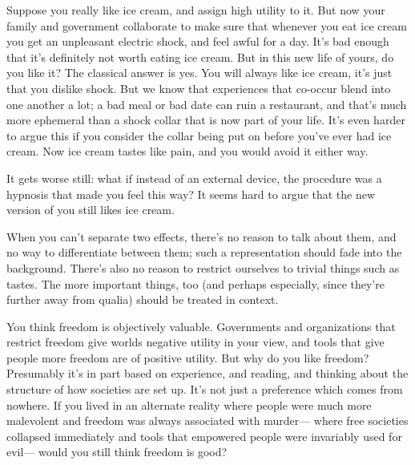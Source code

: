 \documentclass{article}
\begin{document}
	\begin{example}
		Suppose you really like ice cream, and assign high utility to it. But now your family and government collaborate to make sure that whenever you eat ice cream you get an unpleasant electric shock, and feel awful for a day. It's bad enough that it's definitely not worth eating ice cream. But in this new life of yours, do you like it? The classical answer is yes. You will always like ice cream, it's just that you dislike shock. But we know that experiences that co-occur blend into one another a lot; a bad meal or bad date can ruin a restaurant, and that's much more ephemeral than a shock collar that is now part of your life. It's even harder to argue this if you consider the collar being put on before you've ever had ice cream. Now ice cream tastes like pain, and you would avoid it either way.		
		
		It gets worse still: what if instead of an external device, the procedure was a hypnosis that made you feel this way? It seems hard to argue that the new version of you still likes ice cream.
	\end{example}

	When you can't separate two effects, there's no reason to talk about them, and no way to differentiate between them; such a representation should fade into the background. There's also no reason to restrict ourselves to trivial things such as tastes. The more important things, too (and perhaps especially, since they're further away from qualia) should be treated in context.
	
	\begin{example}
		You think freedom is objectively valuable. Governments and organizations that restrict freedom give worlds negative utility in your view, and tools that give people more freedom are of positive utility. But why do you like freedom? Presumably it's in part based on experience, and reading, and thinking about the structure of how societies are set up. It's not just a preference which comes from nowhere. If you lived in an alternate reality where people were much more malevolent and freedom was always associated with murder--- where free societies collapsed immediately and tools that empowered people were invariably used for evil--- would you still think freedom is good?
	\end{example}
\end{document}
